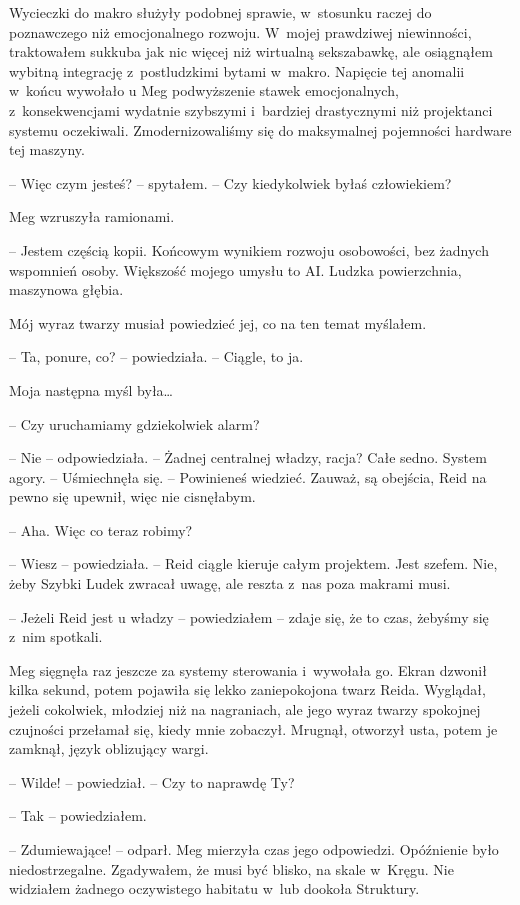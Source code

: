 \documentclass[oneside,polish,11pt,sfheadings]{mwbk}
\begin{document}
Wycieczki do makro służyły podobnej sprawie, w~stosunku raczej do
poznawczego niż emocjonalnego rozwoju. W~mojej prawdziwej niewinności,
traktowałem sukkuba jak nic więcej niż wirtualną sekszabawkę, ale
osiągnąłem wybitną integrację z~postludzkimi bytami w~makro. Napięcie
tej anomalii w~końcu wywołało u Meg podwyższenie stawek emocjonalnych, z~konsekwencjami wydatnie szybszymi i~bardziej drastycznymi niż
projektanci systemu oczekiwali. Zmodernizowaliśmy się do maksymalnej
pojemności hardware tej maszyny.

-- Więc czym jesteś? -- spytałem. -- Czy kiedykolwiek byłaś człowiekiem?

Meg wzruszyła ramionami. 

-- Jestem częścią kopii. Końcowym wynikiem
rozwoju osobowości, bez żadnych wspomnień osoby. Większość mojego umysłu
to AI. Ludzka powierzchnia, maszynowa głębia.

Mój wyraz twarzy musiał powiedzieć jej, co na ten temat myślałem.

-- Ta, ponure, co? -- powiedziała. -- Ciągle, to ja.

Moja następna myśl była\ldots

-- Czy uruchamiamy gdziekolwiek alarm?

-- Nie -- odpowiedziała. -- Żadnej centralnej władzy, racja? Całe sedno.
System agory. -- Uśmiechnęła się. -- Powinieneś wiedzieć. Zauważ, są
obejścia, Reid na pewno się upewnił, więc nie cisnęłabym.

-- Aha. Więc co teraz robimy?

-- Wiesz -- powiedziała. -- Reid ciągle kieruje całym projektem. Jest
szefem. Nie, żeby Szybki Ludek zwracał uwagę, ale reszta z~nas poza
makrami musi.

-- Jeżeli Reid jest u władzy -- powiedziałem -- zdaje się, że to czas,
żebyśmy się z~nim spotkali.

Meg sięgnęła raz jeszcze za systemy sterowania i~wywołała go. Ekran
dzwonił kilka sekund, potem pojawiła się lekko zaniepokojona twarz
Reida. Wyglądał, jeżeli cokolwiek, młodziej niż na nagraniach, ale jego
wyraz twarzy spokojnej czujności przełamał się, kiedy mnie zobaczył.
Mrugnął, otworzył usta, potem je zamknął, język oblizujący wargi.

-- Wilde! -- powiedział. -- Czy to naprawdę Ty?

-- Tak -- powiedziałem.

-- Zdumiewające! -- odparł. Meg mierzyła czas jego odpowiedzi. Opóźnienie
było niedostrzegalne. Zgadywałem, że musi być blisko, na skale w~Kręgu.
Nie widziałem żadnego oczywistego habitatu w~lub dookoła Struktury.
\end{document}
